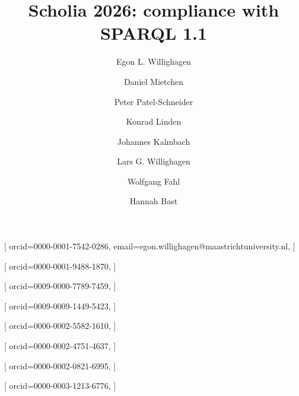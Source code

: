 \documentclass{ceurart}
\begin{document}


\title{Scholia 2026: compliance with SPARQL 1.1}

\author[1]{Egon L. Willighagen}[%
    orcid=0000-0001-7542-0286,
    email=egon.willighagen@maastrichtuniversity.nl, %
]

\author[2,3,4]{Daniel Mietchen}[%
    orcid=0000-0001-9488-1870,
]

\author{Peter Patel-Schneider}[%
    orcid=0009-0000-7789-7459,
]

\author[5]{Konrad Linden}[%
    orcid=0009-0009-1449-5423,
]

\author[5]{Johannes Kalmbach}[%
    orcid=0000-0002-5582-1610,
]

\author[6]{Lars G. Willighagen}[%
    orcid=0000-0002-4751-4637,
]

\author[7]{Wolfgang Fahl}[%
    orcid=0000-0002-0821-6995,
]

\author[5]{Hannah Bast}[%
    orcid=0000-0003-1213-6776,
]

\address[1]{Department of Translational Genomics, NUTRIM, Maastricht University, The Netherlands}
\address[2]{FIZ Karlsruhe -- Leibniz Institute for Information Infrastructure, Karlsruhe, Germany}
\address[3]{Leibniz Institute of Freshwater Ecology and Inland Fisheries (IGB), Berlin, Germany}
\address[4]{Institute for Globally Distributed Open Research and Education (IGDORE), Jena, Germany}
\address[5]{Albert-Ludwigs-Universität Freiburg, Freiburg im Breisgau, Germany}
\address[6]{Department of Ecology, Radboud Institute for Biological and Environmental Sciences,
  Radboud University, The Netherlands}
\address[7]{BITPlan GmbH, Willich, Germany}
\end{document}
